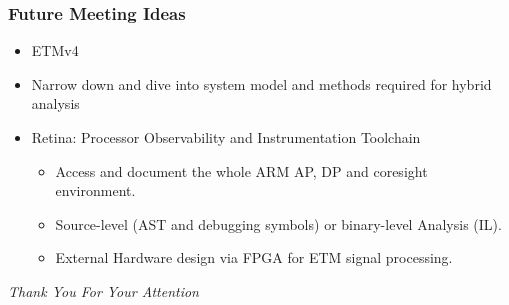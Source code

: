 \documentclass{beamer}
\begin{document}
\begin{frame}
    \frametitle{Future Meeting Ideas}
    \begin{itemize}
        \item ETMv4
        \item Narrow down and dive into system model and methods required for hybrid analysis
        \item Retina: Processor Observability and Instrumentation Toolchain
            \begin{itemize}
                \item Access and document the whole ARM AP, DP and coresight environment.
                \item Source-level (AST and debugging symbols) or binary-level Analysis (IL).
                \item External Hardware design via FPGA for ETM signal processing.
            \end{itemize}
    \end{itemize}
\end{frame}
\begin{frame}
  \centering \Large
  \emph{Thank You For Your Attention}
\end{frame}
\end{document}
